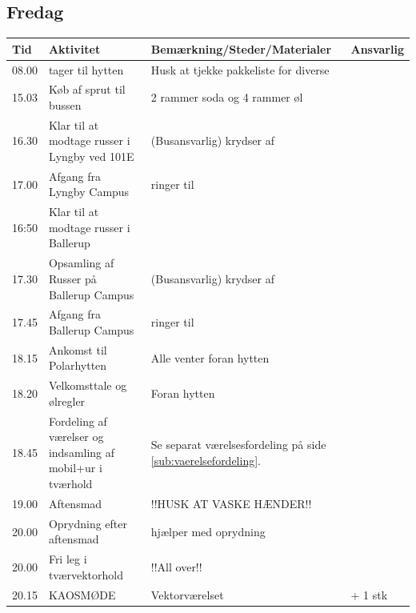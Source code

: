 \subsection{Fredag}
\begin{tabular}{ | p{1cm} | p{4cm} | p{5.5cm} | p{4cm} | }
\hline
	Tid & Aktivitet & Bemærkning/Steder/Materialer & Ansvarlig \\ \hline
	08.00 & \KABS tager til hytten & Husk at tjekke pakkeliste for diverse & \KABS \\ \hline
	15.03 & Køb af sprut til bussen & 2 rammer soda og 4 rammer øl & \Ora \Johnny \\ \hline
	16.30 & Klar til at modtage russer i Lyngby ved 101E & \Ora (Busansvarlig) krydser af & \Ora \YOLO \Lucyfar \Johnny \\ \hline
	17.00 & Afgang fra Lyngby Campus & \Ora ringer til \BIATCH &  \\ \hline
	16:50 & Klar til at modtage russer i Ballerup &  & \BIATCH \Gabriel \\ \hline
	17.30 & Opsamling af Russer på Ballerup Campus & \Ora (Busansvarlig) krydser af &  \\ \hline
	17.45 & Afgang fra Ballerup Campus & \Ora ringer til \KABS &  \\ \hline
	18.15 & Ankomst til Polarhytten & Alle venter foran hytten &  \\ \hline
	18.20 & Velkomsttale og ølregler & Foran hytten & \Alle \\ \hline
	18.45 & Fordeling af værelser og indsamling af mobil+ur i tværhold & Se separat værelsesfordeling på side \ref{sub:vaerelsefordeling}. & \Alle \\ \hline
	19.00 & Aftensmad & !!HUSK AT VASKE HÆNDER!! & \Hyttebombz{} \KABS \\ \hline
	20.00 & Oprydning efter aftensmad & \Hippier hjælper med oprydning & \Hyttebombz{} \Ora \\ \hline
	20.00 & Fri leg i tværvektorhold & !!All over!! & \Alle \\ \hline
	20.15 & KAOSMØDE & Vektorværelset & \Alle \KABS + 1 stk \Hyttebombz{} \\ \hline
\end{tabular}

